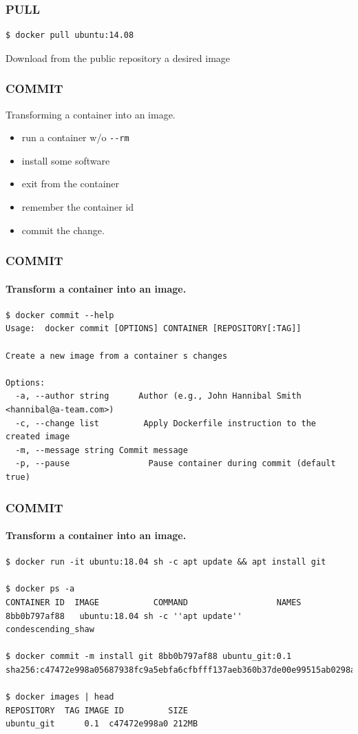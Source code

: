\begin{frame}[fragile]
\frametitle{PULL}
\begin{lstlisting}
$ docker pull ubuntu:14.08
\end{lstlisting}

Download from the public repository a desired image
\end{frame}

\begin{frame}[fragile]
\frametitle{COMMIT}
Transforming a container into an image.
\begin{itemize}
\item run a container w/o \lstinline!--rm!
\item install some software
\item exit from the container
\item remember the container id
\item commit the change.
\end{itemize}
\end{frame}

\begin{frame}[fragile]
\frametitle{COMMIT}
\framesubtitle{Transform a container into an image.}
\scriptsize
\begin{lstlisting}[breaklines=true]
$ docker commit --help
Usage:  docker commit [OPTIONS] CONTAINER [REPOSITORY[:TAG]]

Create a new image from a container s changes

Options:
  -a, --author string      Author (e.g., John Hannibal Smith <hannibal@a-team.com>)
  -c, --change list         Apply Dockerfile instruction to the created image
  -m, --message string Commit message
  -p, --pause                Pause container during commit (default true)
\end{lstlisting}
\normalsize
\end{frame}

\begin{frame}[fragile]
\frametitle{COMMIT}
\framesubtitle{Transform a container into an image.}
\scriptsize
\begin{lstlisting}[breaklines=true]
$ docker run -it ubuntu:18.04 sh -c apt update && apt install git

$ docker ps -a
CONTAINER ID  IMAGE           COMMAND                  NAMES
8bb0b797af88   ubuntu:18.04 sh -c ''apt update''       condescending_shaw

$ docker commit -m install git 8bb0b797af88 ubuntu_git:0.1
sha256:c47472e998a05687938fc9a5ebfa6cfbfff137aeb360b37de00e99515ab0298a

$ docker images | head
REPOSITORY  TAG IMAGE ID         SIZE
ubuntu_git      0.1  c47472e998a0 212MB
\end{lstlisting}
\normalsize
\end{frame}